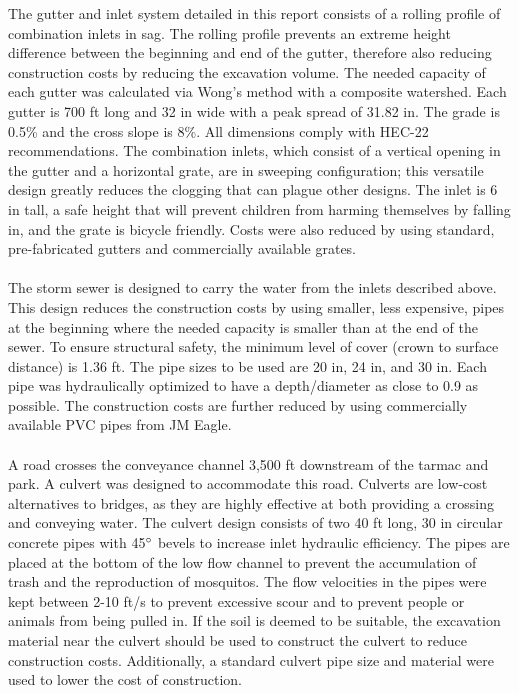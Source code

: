 \documentclass[11pt,letterpaper,final]{report}
\begin{document}
\begin{flushleft}
The gutter and inlet system detailed in this report consists of a rolling profile of combination inlets in sag. The rolling profile prevents an extreme height difference between the beginning and end of the gutter, therefore also reducing construction costs by reducing the excavation volume. The needed capacity of each gutter was calculated via Wong's method with a composite watershed. Each gutter is 700 ft long and 32 in wide with a peak spread of 31.82 in. The grade is 0.5\% and the cross slope is 8\%. All dimensions comply with HEC-22 recommendations. The combination inlets, which consist of a vertical opening in the gutter and a horizontal grate, are in sweeping configuration; this versatile design greatly reduces the clogging that can plague other designs. The inlet is 6 in tall, a safe height that will prevent children from harming themselves by falling in, and the grate is bicycle friendly. Costs were also reduced by using standard, pre-fabricated gutters and commercially available grates. \\~\\

The storm sewer is designed to carry the water from the inlets described above. This design reduces the construction costs by using smaller, less expensive, pipes at the beginning where the needed capacity is smaller than at the end of the sewer. To ensure structural safety, the minimum level of cover (crown to surface distance) is 1.36 ft. The pipe sizes to be used are 20 in, 24 in, and 30 in. Each pipe was hydraulically optimized to have a depth/diameter as close to 0.9 as possible. The construction costs are further reduced by using commercially available PVC pipes from JM Eagle. \\~\\

A road crosses the conveyance channel 3,500 ft downstream of the tarmac and park. A culvert was designed to accommodate this road. Culverts are low-cost alternatives to bridges, as they are highly effective at both providing a crossing and conveying water. The culvert design consists of two 40 ft long, 30 in circular concrete pipes with 45$\degree$ bevels to increase inlet hydraulic efficiency. The pipes are placed at the bottom of the low flow channel to prevent the accumulation of trash and the reproduction of mosquitos. The flow velocities in the pipes were kept between 2-10 ft/s to prevent excessive scour and to prevent people or animals from being pulled in. If the soil is deemed to be suitable, the excavation material near the culvert should be used to construct the culvert to reduce construction costs. Additionally, a standard culvert pipe size and material were used to lower the cost of construction. \\~\\


\end{flushleft}
\end{document}
